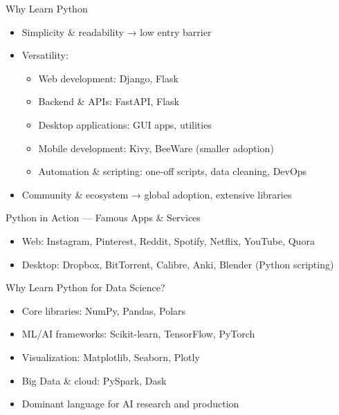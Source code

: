 \documentclass[12pt, aspectratio=169]{beamer}
\begin{document}
    \begin{frame}{Why Learn Python}
        \begin{itemize}
            \item Simplicity \& readability → low entry barrier
            \item Versatility:
            \begin{itemize}
                \item Web development: Django, Flask
                \item Backend \& APIs: FastAPI, Flask
                \item Desktop applications: GUI apps, utilities
                \item Mobile development: Kivy, BeeWare (smaller adoption)
                \item Automation \& scripting: one-off scripts, data cleaning, DevOps
            \end{itemize}
            \item Community \& ecosystem → global adoption, extensive libraries
        \end{itemize}
    \end{frame}


    \begin{frame}{Python in Action — Famous Apps \& Services}
        \begin{itemize}
            \item Web: Instagram, Pinterest, Reddit, Spotify, Netflix, YouTube, Quora
            \item Desktop: Dropbox, BitTorrent, Calibre, Anki, Blender (Python scripting)
        \end{itemize}
    \end{frame}


    \begin{frame}{Why Learn Python for Data Science?}
        \begin{itemize}
            \item Core libraries: NumPy, Pandas, Polars
            \item ML/AI frameworks: Scikit-learn, TensorFlow, PyTorch
            \item Visualization: Matplotlib, Seaborn, Plotly
            \item Big Data \& cloud: PySpark, Dask
            \item Dominant language for AI research and production
        \end{itemize}
    \end{frame}
\end{document}
